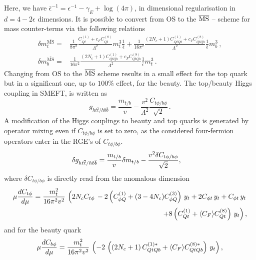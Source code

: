 	Here, we have $\bar{\epsilon}^{-1} = \epsilon^{-1}- \gamma_E +\log(4 \pi)$, in dimensional regularisation in $d=4-2\epsilon$ dimensions. 
	It is possible to convert from OS to the $\MSbar$ -- scheme for mass counter-terms via the following relations
	\begin{align}
		\delta m_t^{\bar{\text{MS}}} =&\frac{1}{8 \pi^2} \frac{C_{Qt}^{(1)}+c_F C_{Qt}^{(8)}}{\Lambda^2}m_t^3\frac{1}{\bar{\epsilon}}+ \frac{1}{16 \pi^2}  \frac{(2 N_c+1) C_{QtQb}^{(1)}+c_F C_{QtQb}^{(8)}}{\Lambda^2}   \frac{1}{\bar{\epsilon}}  m_b^3\,,  \\
		\delta m_b^{\bar{\text{MS}}}=&\frac{1}{16 \pi^2} \frac{(2 N_c+1)C_{QtQb}^{(1)}+c_F C_{QtQb}^{(8)}}{\Lambda^2}\frac{1}{\bar{\epsilon}} m_t^3\,.
	\end{align} 
	Changing from OS to the  $\MSbar$ scheme results in a small effect for the top quark but in a significant one, up to $100\%$ effect, for the beauty. 
	The top/beauty Higgs coupling in SMEFT, is written as
	\begin{equation}
		g_{ht\bar{t}/hb\bar{b}}=\frac{m_{t/b}}{v}-\frac{v^2}{\Lambda^2}\frac{C_{t\phi/b\phi}}{\sqrt{2}}\,.
	\end{equation}
	A modification of the Higgs couplings to beauty and top quarks is generated by operator mixing even if $C_{t\phi/b\phi}$ is set to zero, as the considered four-fermion operators enter in the RGE's of $C_{t\phi/b\phi}$.
	\begin{align}
		\delta	g_{ht\bar{t}/hb\bar{b}} &=  {m_{t/b}\over v} \delta{m_{t/b}} -{v^2 \delta{C_{t\phi/b\phi}}\over \sqrt{2} },
	\end{align}
	where $\delta{C_{t\phi/b\phi}}$ is directly read from the anomalous dimension~\cite{Alonso:2013hga}
\begin{align}
	\mu \frac{d \cuh}{d \mu} = \frac{m_t^2}{16\pi^2v^2}\,\left( 2 N_c \cuh\, -2 \left( C_{\phi Q}^{(1)} +(3-4N_c) C_{\phi Q}^{(3)} \right) \,y_t +2C_{\phi t} \,y_t+C_{\phi t}\,y_t \right.\nonumber   \\\left. \qquad \qquad+ 8\left( C_{Qt}^{(1)}+ \langle C_F \rangle C_{Qt}^{(8)} \right)\,y_t  \right),
\end{align}
and for the beauty quark
\begin{align}
	\mu \frac{d \cbh}{d \mu} = \frac{m_t^2}{16\pi^2v^2}\,\left(  -2\,\left( (2N_c+1)\,\cquqd^{(1)*}+\langle C_F \rangle \cquqd^{(8)*}\right)  \,y_t \right),
\end{align}
